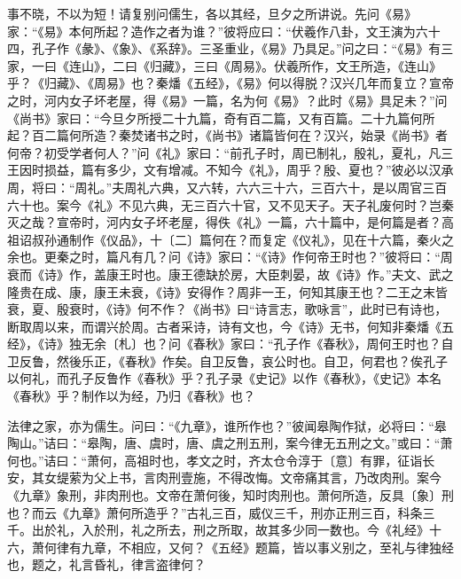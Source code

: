 \documentclass[]{article}
\begin{document}
事不晓，不以为短！请复别问儒生，各以其经，旦夕之所讲说。先问《易》家：``《易》本何所起？造作之者为谁？''彼将应曰：``伏羲作八卦，文王演为六十四，孔子作《彖》、《象》、《系辞》。三圣重业，《易》乃具足。''问之曰：``《易》有三家，一曰《连山》，二曰《归藏》，三曰《周易》。伏羲所作，文王所造，《连山》乎？《归藏》、《周易》也？秦燔《五经》，《易》何以得脱？汉兴几年而复立？宣帝之时，河内女子坏老屋，得《易》一篇，名为何《易》？此时《易》具足未？''问《尚书》家曰：``今旦夕所授二十九篇，奇有百二篇，又有百篇。二十九篇何所起？百二篇何所造？秦焚诸书之时，《尚书》诸篇皆何在？汉兴，始录《尚书》者何帝？初受学者何人？''问《礼》家曰：``前孔子时，周已制礼，殷礼，夏礼，凡三王因时损益，篇有多少，文有增减。不知今《礼》，周乎？殷、夏也？''彼必以汉承周，将曰：``周礼。''夫周礼六典，又六转，六六三十六，三百六十，是以周官三百六十也。案今《礼》不见六典，无三百六十官，又不见天子。天子礼废何时？岂秦灭之哉？宣帝时，河内女子坏老屋，得佚《礼》一篇，六十篇中，是何篇是者？高祖诏叔孙通制作《仪品》，十〔二〕篇何在？而复定《仪礼》，见在十六篇，秦火之余也。更秦之时，篇凡有几？问《诗》家曰：``《诗》作何帝王时也？''彼将曰：``周衰而《诗》作，盖康王时也。康王德缺於房，大臣刺晏，故《诗》作。''夫文、武之隆贵在成、康，康王未衰，《诗》安得作？周非一王，何知其康王也？二王之末皆衰，夏、殷衰时，《诗》何不作？《尚书》曰``诗言志，歌咏言''，此时已有诗也，断取周以来，而谓兴於周。古者采诗，诗有文也，今《诗》无书，何知非秦燔《五经》，《诗》独无余〔札〕也？问《春秋》家曰：``孔子作《春秋》，周何王时也？自卫反鲁，然後乐正，《春秋》作矣。自卫反鲁，哀公时也。自卫，何君也？俟孔子以何礼，而孔子反鲁作《春秋》乎？孔子录《史记》以作《春秋》，《史记》本名《春秋》乎？制作以为经，乃归《春秋》也？

法律之家，亦为儒生。问曰：``《九章》，谁所作也？''彼闻皋陶作狱，必将曰：``皋陶山。''诘曰：``皋陶，唐、虞时，唐、虞之刑五刑，案今律无五刑之文。''或曰：``萧何也。''诘曰：``萧何，高祖时也，孝文之时，齐太仓令淳于〔意〕有罪，征诣长安，其女缇萦为父上书，言肉刑壹施，不得改悔。文帝痛其言，乃改肉刑。案今《九章》象刑，非肉刑也。文帝在萧何後，知时肉刑也。萧何所造，反具〔象〕刑也？而云《九章》萧何所造乎？''古礼三百，威仪三千，刑亦正刑三百，科条三千。出於礼，入於刑，礼之所去，刑之所取，故其多少同一数也。今《礼经》十六，萧何律有九章，不相应，又何？《五经》题篇，皆以事义别之，至礼与律独经也，题之，礼言昏礼，律言盗律何？
\end{document}
